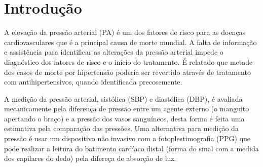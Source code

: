 \documentclass[conference,compsoc]{IEEEtran}
\begin{document}




\maketitle


\begin{abstract}

\end{abstract}



%
\IEEEpeerreviewmaketitle


\section{Introdu\c{c}\~{a}o}
A eleva\c{c}\~ao da press\~ao arterial (PA) \'e um dos fatores de risco para as doen\c{c}as cardiovasculares que \'e a principal causa de morte mundial. A falta de informa\c{c}\~ao e assist\^encia para identificar as altera\c{c}\~oes da press\~ao arterial impede o diagn\'ostico dos fatores de risco e o in\'icio do tratamento. \'E relatado que metade dos casos de morte por hipertens\~ao poderia ser revertido atrav\'es de tratamento com antihipertensivos, quando identificada precosemente. \cite{KISHORE:2008}

A medi\c{c}\~ao da press\~ao arterial, sist\'olica (SBP) e diast\'olica (DBP), \'e avaliada mecanicamente pela diferen\c{c}a de press\~ao entre um agente externo (o manguito apertando o bra\c{c}o) e a press\~ao dos vasos sangu\'ineos, desta forma \'e feita uma estimativa pela compara\c{c}\~ao das press\~oes. Uma alternativa para medi\c{c}\~ao da press\~ao \'e usar um dispositivo n\~ao invasivo com a fotoplestimografia (PPG) que pode realizar a leitura do batimento card\'iaco distal (forma do sinal com a medida dos capilares do dedo) pela difere\c{c}a de absor\c{c}\~ao de luz. \cite{MORENO:2011}
\end{document}
